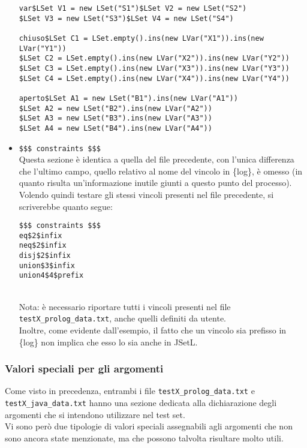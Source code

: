 \begin{itemize}
\begin{lstlisting}
var$LSet V1 = new LSet("S1")$LSet V2 = new LSet("S2")
$LSet V3 = new LSet("S3")$LSet V4 = new LSet("S4")

chiuso$LSet C1 = LSet.empty().ins(new LVar("X1")).ins(new LVar("Y1"))
$LSet C2 = LSet.empty().ins(new LVar("X2")).ins(new LVar("Y2"))
$LSet C3 = LSet.empty().ins(new LVar("X3")).ins(new LVar("Y3"))
$LSet C4 = LSet.empty().ins(new LVar("X4")).ins(new LVar("Y4"))

aperto$LSet A1 = new LSet("B1").ins(new LVar("A1"))
$LSet A2 = new LSet("B2").ins(new LVar("A2"))
$LSet A3 = new LSet("B3").ins(new LVar("A3"))
$LSet A4 = new LSet("B4").ins(new LVar("A4"))
\end{lstlisting}

\item \texttt{\$\$\$ constraints \$\$\$} \\
Questa sezione è identica a quella del file precedente, con l'unica differenza che l'ultimo campo, quello relativo al nome del vincolo in \{log\}, è omesso (in quanto risulta un'informazione inutile giunti a questo punto del processo).\\
Volendo quindi testare gli stessi vincoli presenti nel file precedente, si scriverebbe quanto segue:\\

\begin{lstlisting}
$$$ constraints $$$
eq$2$infix
neq$2$infix
disj$2$infix
union$3$infix
union4$4$prefix
\end{lstlisting}\\

Nota: è necessario riportare tutti i vincoli presenti nel file \texttt{testX\_prolog\_data.txt}, anche quelli definiti da utente. \\
Inoltre, come evidente dall'esempio, il fatto che un vincolo sia prefisso in \{log\} non implica che esso lo sia anche in JSetL.\\

\end{itemize}

\subsubsection{Valori speciali per gli argomenti}
Come visto in precedenza, entrambi i file \texttt{testX\_prolog\_data.txt} e \\ \texttt{testX\_java\_data.txt} hanno una sezione dedicata alla dichiarazione degli argomenti che si intendono utilizzare nel test set.\\
Vi sono però due tipologie di valori speciali assegnabili agli argomenti che non sono ancora state menzionate, ma che possono talvolta risultare molto utili.

